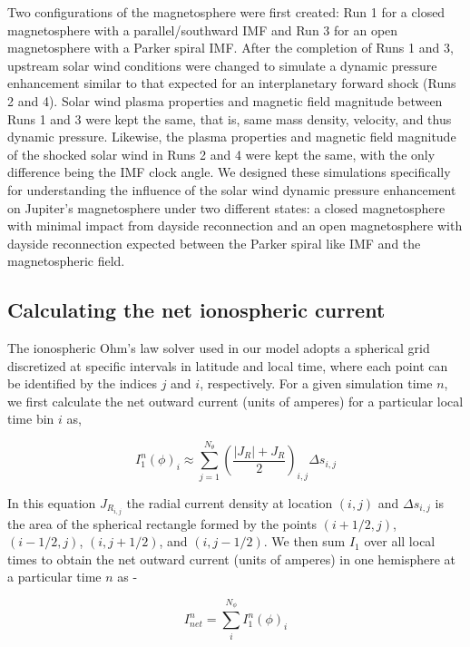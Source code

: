 Two configurations of the magnetosphere were first created: Run 1 for a closed magnetosphere with a parallel/southward IMF and Run 3 for an open magnetosphere with a Parker spiral IMF. After the completion of Runs 1 and 3, upstream solar wind conditions were changed to simulate a dynamic pressure enhancement similar to that expected for an interplanetary forward shock (Runs 2 and 4). Solar wind plasma properties and magnetic field magnitude between Runs 1 and 3 were kept the same, that is, same mass density, velocity, and thus dynamic pressure. Likewise, the plasma properties and magnetic field magnitude of the shocked solar wind in Runs 2 and 4 were kept the same, with the only difference being the IMF clock angle. We designed these simulations specifically for understanding the influence of the solar wind dynamic pressure enhancement on Jupiter's magnetosphere under two different states: a closed magnetosphere with minimal impact from dayside reconnection and an open magnetosphere with dayside reconnection expected between the Parker spiral like IMF and the magnetospheric field.

\subsection{Calculating the net ionospheric current}
The ionospheric Ohm's law solver used in our model adopts a spherical grid discretized at specific intervals in latitude and local time, where each point can be identified by the indices $j$ and $i$, respectively. For a given simulation time $n$, we first calculate the net outward current (units of amperes) for a particular local time bin $i$ as,

\begin{equation}
    I_1^n \left(\phi\right)_i \approx \sum_{j=1}^{N_\theta} \left( \frac{|J_R| + J_R }{2} \right)_{i,j} \Delta s_{i,j}
\end{equation}

In this equation $J_{R_{i,j}}$ the radial current density at location $(i,j)$ and $\Delta s_{i,j}$ is the area of the spherical rectangle formed by the points $(i+1/2,j)$, $(i-1/2,j)$, $(i,j+1/2)$, and $(i,j-1/2)$. We then sum $I_1$ over all local times to obtain the net outward current (units of amperes) in one hemisphere at a particular time $n$ as - 

\begin{equation}
    I_{net}^n = \sum_i^{N_\phi} I_1^n(\phi)_i
\end{equation}

